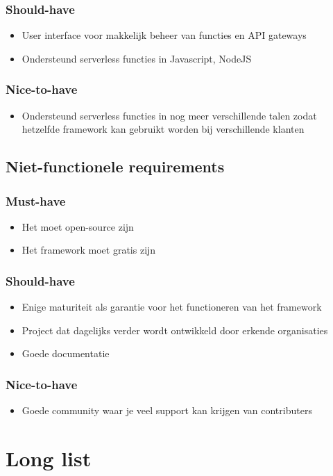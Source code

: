 \subsubsection{Should-have}
\begin{itemize}
    \item User interface voor makkelijk beheer van functies en API gateways
    \item Ondersteund serverless functies in Javascript, NodeJS
\end{itemize}
\subsubsection{Nice-to-have}
\begin{itemize}
    \item Ondersteund serverless functies in nog meer verschillende talen zodat hetzelfde framework kan gebruikt worden bij verschillende klanten
\end{itemize}
\subsection{Niet-functionele requirements}
\subsubsection{Must-have}
\begin{itemize}
    \item Het moet open-source zijn
    \item Het framework moet gratis zijn
\end{itemize}
\subsubsection{Should-have}
\begin{itemize}
    \item Enige maturiteit als garantie voor het functioneren van het framework
    \item Project dat dagelijks verder wordt ontwikkeld door erkende organisaties
    \item Goede documentatie
\end{itemize}
\subsubsection{Nice-to-have}
\begin{itemize}
    \item Goede community waar je veel support kan krijgen van contributers
\end{itemize}

\section{Long list}